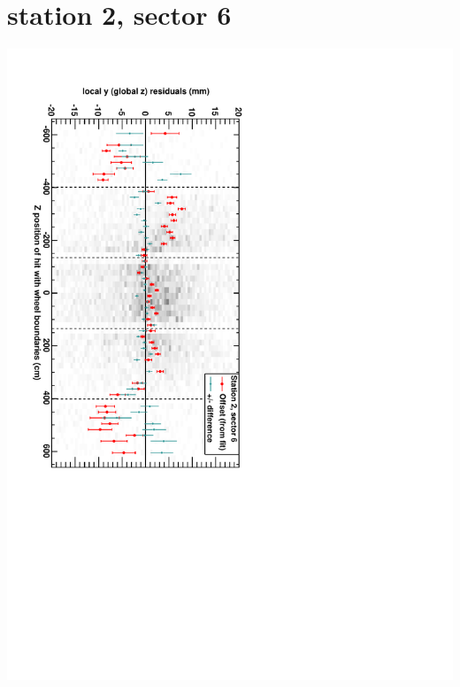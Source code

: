 \documentclass[compress]{beamer}
\begin{document}
\section*{station 2, sector 6}
\begin{frame} \vfill \mbox{\hspace{-1 cm}\includegraphics[height=1.2\linewidth, angle=90]{DTzVsZ_st2_sr06.pdf}} \end{frame}
\end{document}
